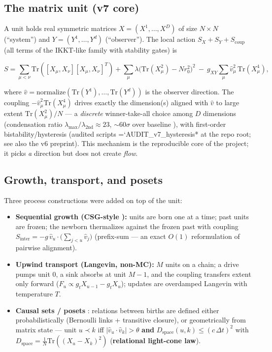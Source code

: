 \documentclass[12pt,a4paper]{article}
\providecommand{\tightlist}{%
  \setlength{\itemsep}{0pt}\setlength{\parskip}{0pt}}
\renewcommand{\texttt}[1]{{\ttfamily\hyphenchar\font=`\-\relax #1}}
\begin{document}
\subsection{The matrix unit (v7
core)}\label{the-matrix-unit-v7-core}

A unit holds real symmetric matrices \(X = (X^1,\dots,X^D)\) of size
\(N\times N\) (``system'') and \(Y = (Y^1,\dots,Y^d)\) (``observer'').
The local action \(S_X + S_Y + S_{\mathrm{coup}}\) (all terms of the
IKKT-like family \cite{ishibashi_kawai_kitazawa_tsuchiya_1997} with stability gates) is

\[S = \sum_{\mu<\nu}\mathrm{Tr}([X_\mu,X_\nu][X_\mu,X_\nu]^T) + \sum_\mu \lambda\big(\mathrm{Tr}(X_\mu^2)-Nr_0^2\big)^2 \ -\ g_{XY}\sum_\mu \hat v_\mu^2\,\mathrm{Tr}(X_\mu^4),\]

where
\(\hat v = \mathrm{normalize}(\mathrm{Tr}(Y^1),\dots,\mathrm{Tr}(Y^d))\)
is the observer direction. The coupling
\(-\hat v_\mu^2\mathrm{Tr}(X_\mu^4)\) drives exactly the dimension(s)
aligned with \(\hat v\) to large extent \(\mathrm{Tr}(X_\mu^2)/N\) --- a
\emph{discrete} winner-take-all choice among \(D\) dimensions
(condensation ratio \(\lambda_{\max}/\lambda_{2\mathrm{nd}}\approx 23\),
\(\sim 60\sigma\) over baseline \cite{chanpengpad_sgoed_v2}), with
first-order bistability/hysteresis (audited scripts
\texttt{AUDIT\_v7\_hysteresis*} at the repo root; see also the v6
preprint). This mechanism is the reproducible core of the project; it
picks \emph{a} direction but does not create \emph{flow}.

\subsection{Growth, transport, and
posets}\label{growth-transport-and-posets}

Three process constructions were added on top of the unit:

\begin{itemize}
\tightlist
\item
  \textbf{Sequential growth (CSG-style \cite{rideout_sorkin_2000}):}
  units are born one at a time; past units are frozen; the newborn
  thermalizes against the frozen past with coupling
  \(S_{\mathrm{inter}} = -g\,\hat v_u\cdot \big(\sum_{j<u}\hat v_j\big)\)
  (prefix-sum --- an exact \(O(1)\) reformulation of pairwise
  alignment).
\item
  \textbf{Upwind transport (Langevin, non-MC):} \(M\) units on a chain;
  a drive pumps unit \(0\), a sink absorbs at unit \(M-1\), and the
  coupling transfers extent only forward
  (\(F_u \propto g_t X_{u-1} - g_t X_u\)); updates are overdamped
  Langevin with temperature \(T\).
\item
  \textbf{Causal sets / posets} \cite{sorkin_2005}: relations
  between births are defined either probabilistically (Bernoulli links +
  transitive closure), or geometrically from matrix state --- unit
  \(u\prec k\) iff \(|\hat v_u\cdot \hat v_k|>\theta\) \textbf{and}
  \(D_{\mathrm{space}}(u,k)\le (c\,\Delta t)^2\) with
  \(D_{\mathrm{space}} = \frac{1}{N}\mathrm{Tr}((X_u-X_k)^2)\)
  (\textbf{relational light-cone law}).
\end{itemize}
\end{document}

